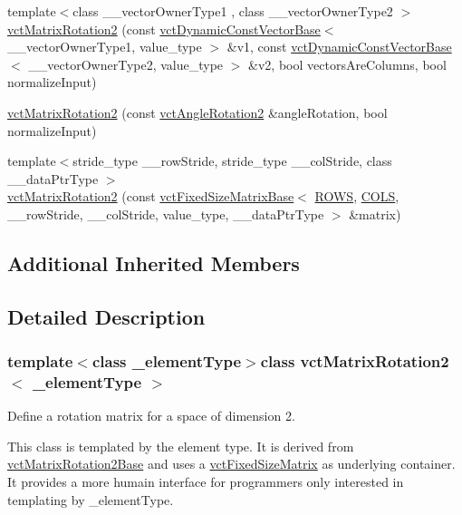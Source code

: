 \begin{DoxyCompactItemize}
\item 
{\footnotesize template$<$class \-\_\-\-\_\-vector\-Owner\-Type1 , class \-\_\-\-\_\-vector\-Owner\-Type2 $>$ }\\\hyperlink{classvct_matrix_rotation2_a51259e7423cae941178e9bb516182a63}{vct\-Matrix\-Rotation2} (const \hyperlink{classvct_dynamic_const_vector_base}{vct\-Dynamic\-Const\-Vector\-Base}$<$ \-\_\-\-\_\-vector\-Owner\-Type1, value\-\_\-type $>$ \&v1, const \hyperlink{classvct_dynamic_const_vector_base}{vct\-Dynamic\-Const\-Vector\-Base}$<$ \-\_\-\-\_\-vector\-Owner\-Type2, value\-\_\-type $>$ \&v2, bool vectors\-Are\-Columns, bool normalize\-Input)
\item 
\hyperlink{classvct_matrix_rotation2_aa174886e20cb79696ad4a41ca2b08748}{vct\-Matrix\-Rotation2} (const \hyperlink{classvct_angle_rotation2}{vct\-Angle\-Rotation2} \&angle\-Rotation, bool normalize\-Input)
\item 
{\footnotesize template$<$stride\-\_\-type \-\_\-\-\_\-row\-Stride, stride\-\_\-type \-\_\-\-\_\-col\-Stride, class \-\_\-\-\_\-data\-Ptr\-Type $>$ }\\\hyperlink{classvct_matrix_rotation2_a81ca92f57e9e2bd0a34722e9b3603e01}{vct\-Matrix\-Rotation2} (const \hyperlink{classvct_fixed_size_matrix_base}{vct\-Fixed\-Size\-Matrix\-Base}$<$ \hyperlink{classvct_matrix_rotation2_ac2875a62bcfe1fb310808a4aff444120a405943de2af4c1dae37a90156248a41b}{R\-O\-W\-S}, \hyperlink{classvct_matrix_rotation2_ac2875a62bcfe1fb310808a4aff444120a3f895b9e3be292e80920a74194301b11}{C\-O\-L\-S}, \-\_\-\-\_\-row\-Stride, \-\_\-\-\_\-col\-Stride, value\-\_\-type, \-\_\-\-\_\-data\-Ptr\-Type $>$ \&matrix)
\end{DoxyCompactItemize}
\subsection*{Additional Inherited Members}


\subsection{Detailed Description}
\subsubsection*{template$<$class \-\_\-element\-Type$>$class vct\-Matrix\-Rotation2$<$ \-\_\-element\-Type $>$}

Define a rotation matrix for a space of dimension 2. 

This class is templated by the element type. It is derived from \hyperlink{classvct_matrix_rotation2_base}{vct\-Matrix\-Rotation2\-Base} and uses a \hyperlink{classvct_fixed_size_matrix}{vct\-Fixed\-Size\-Matrix} as underlying container. It provides a more humain interface for programmers only interested in templating by \-\_\-element\-Type.


